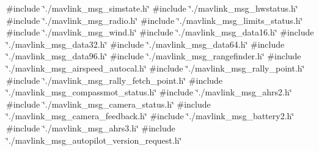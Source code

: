 {\ttfamily \#include \char`\"{}./mavlink\+\_\+msg\+\_\+simstate.\+h\char`\"{}}\newline
{\ttfamily \#include \char`\"{}./mavlink\+\_\+msg\+\_\+hwstatus.\+h\char`\"{}}\newline
{\ttfamily \#include \char`\"{}./mavlink\+\_\+msg\+\_\+radio.\+h\char`\"{}}\newline
{\ttfamily \#include \char`\"{}./mavlink\+\_\+msg\+\_\+limits\+\_\+status.\+h\char`\"{}}\newline
{\ttfamily \#include \char`\"{}./mavlink\+\_\+msg\+\_\+wind.\+h\char`\"{}}\newline
{\ttfamily \#include \char`\"{}./mavlink\+\_\+msg\+\_\+data16.\+h\char`\"{}}\newline
{\ttfamily \#include \char`\"{}./mavlink\+\_\+msg\+\_\+data32.\+h\char`\"{}}\newline
{\ttfamily \#include \char`\"{}./mavlink\+\_\+msg\+\_\+data64.\+h\char`\"{}}\newline
{\ttfamily \#include \char`\"{}./mavlink\+\_\+msg\+\_\+data96.\+h\char`\"{}}\newline
{\ttfamily \#include \char`\"{}./mavlink\+\_\+msg\+\_\+rangefinder.\+h\char`\"{}}\newline
{\ttfamily \#include \char`\"{}./mavlink\+\_\+msg\+\_\+airspeed\+\_\+autocal.\+h\char`\"{}}\newline
{\ttfamily \#include \char`\"{}./mavlink\+\_\+msg\+\_\+rally\+\_\+point.\+h\char`\"{}}\newline
{\ttfamily \#include \char`\"{}./mavlink\+\_\+msg\+\_\+rally\+\_\+fetch\+\_\+point.\+h\char`\"{}}\newline
{\ttfamily \#include \char`\"{}./mavlink\+\_\+msg\+\_\+compassmot\+\_\+status.\+h\char`\"{}}\newline
{\ttfamily \#include \char`\"{}./mavlink\+\_\+msg\+\_\+ahrs2.\+h\char`\"{}}\newline
{\ttfamily \#include \char`\"{}./mavlink\+\_\+msg\+\_\+camera\+\_\+status.\+h\char`\"{}}\newline
{\ttfamily \#include \char`\"{}./mavlink\+\_\+msg\+\_\+camera\+\_\+feedback.\+h\char`\"{}}\newline
{\ttfamily \#include \char`\"{}./mavlink\+\_\+msg\+\_\+battery2.\+h\char`\"{}}\newline
{\ttfamily \#include \char`\"{}./mavlink\+\_\+msg\+\_\+ahrs3.\+h\char`\"{}}\newline
{\ttfamily \#include \char`\"{}./mavlink\+\_\+msg\+\_\+autopilot\+\_\+version\+\_\+request.\+h\char`\"{}}\newline
